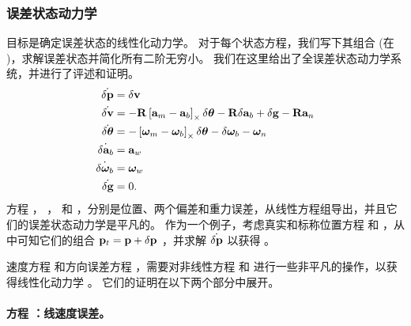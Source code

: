 \subsubsection{误差状态动力学}

目标是确定误差状态的线性化动力学。 
对于每个状态方程，我们写下其组合 (在 )，求解误差状态并简化所有二阶无穷小。 
我们在这里给出了全误差状态动力学系统，并进行了评述和证明。
%
\begin{subequations}\label{equ:efull}
%
\begin{align}
\dot{\delta{\bf p}} &= \delta{\bf v} \label{equ:epos}\\
\dot{\delta{\bf v}} &= -{\bf R}\left[{\bf a}_m-{\bf a}_b\right]_\times\delta{\bm \theta} - {\bf R}\delta{\bf a}_b + \delta{\bf g} - {\bf R}{\bf a}_n \label{equ:evel}\\
\dot{\delta{\bm \theta}} &= -\left[{\bm \omega}_m-{\bm \omega}_b\right]_\times\delta{\bm \theta} - \delta{\bm \omega}_b - {\bm \omega}_n \label{equ:equat}\\
\dot{\delta{\bf a}_b} &= {\bf a}_w \label{equ:eabias}\\
\dot{\delta{\bm \omega}_b} &= {\bm \omega}_w \label{equ:ewbias}\\
\dot{\delta{\bf g}} &= 0 .\label{equ:egrav}
\end{align}%
\end{subequations}
%
方程 ， ，  和 ，分别是位置、两个偏差和重力误差，从线性方程组导出，并且它们的误差状态动力学是平凡的。 
作为一个例子，考虑真实和标称位置方程  和 ，从  中可知它们的组合 ${\bf p}_t={\bf p}+\delta{\bf p}$ ，并求解 $\dot{\delta {\bf p}}$ 以获得 。

速度方程  和方向误差方程 ，需要对非线性方程  和  进行一些非平凡的操作，以获得线性化动力学%
。 
它们的证明在以下两个部分中展开。


\paragraph{方程 ：线速度误差。}

